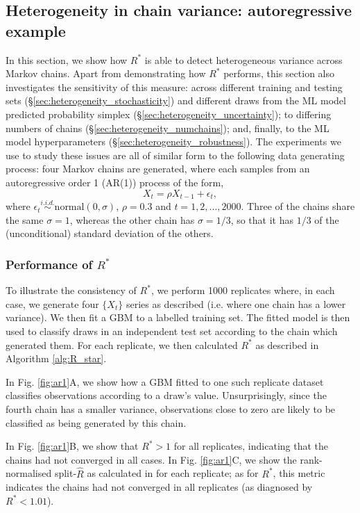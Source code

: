 \documentclass{article}
\begin{document}
\subsection{Heterogeneity in chain variance: autoregressive example}\label{sec:heterogeneity}
In this section, we show how $R^*$ is able to detect heterogeneous variance across Markov chains. Apart from demonstrating how $R^*$ performs, this section also investigates the sensitivity of this measure: across different training and testing sets (\S\ref{sec:heterogeneity_stochasticity}) and different draws from the ML model predicted probability simplex (\S\ref{sec:heterogeneity_uncertainty}); to differing numbers of chains (\S\ref{sec:heterogeneity_numchains}); and, finally, to the ML model hyperparameters (\S\ref{sec:heterogeneity_robustness}). The experiments we use to study these issues are all of similar form to the following data generating process: four Markov chains are generated, where each samples from an autoregressive order 1 (AR(1)) process of the form,
%
\begin{equation}\label{eq:ar1}
X_t = \rho X_{t-1} + \epsilon_t,
\end{equation}
%
where $\epsilon_t\stackrel{i.i.d.}{\sim}\text{normal}(0, \sigma)$, $\rho=0.3$ and $t=1,2,...,2000$. Three of the chains share the same $\sigma=1$, whereas the other chain has $\sigma=1/3$, so that it has $1/3$ of the (unconditional) standard deviation of the others.

\subsubsection{Performance of $R^*$}\label{sec:heterogeneity_performance}
To illustrate the consistency of $R^*$, we perform 1000 replicates where, in each case, we generate four $\{X_t\}$ series as described (i.e. where one chain has a lower variance). We then fit a GBM to a labelled training set. The fitted model is then used to classify draws in an independent test set according to the chain which generated them. For each replicate, we then calculated $R^*$ as described in Algorithm \ref{alg:R_star}.

In Fig. \ref{fig:ar1}A, we show how a GBM fitted to one such replicate dataset classifies observations according to a draw's value. Unsurprisingly, since the fourth chain has a smaller variance, observations close to zero are likely to be classified as being generated by this chain.

In Fig. \ref{fig:ar1}B, we show that $R^*>1$ for all replicates, indicating that the chains had not converged in all cases. In Fig. \ref{fig:ar1}C, we show the rank-normalised split-$\widehat{R}$ as calculated in \cite{vehtari2019rank} for each replicate;  as for $R^*$, this metric indicates the chains had not converged in all replicates (as diagnosed by $R^*<1.01$).
\end{document}
